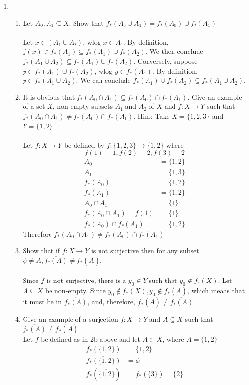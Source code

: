\documentclass[11pt]{article}
\begin{document}
\begin{enumerate}
\begin{enumerate}
\end{enumerate}
\newpage
\item %
\begin{enumerate}
\item Let $A_0 , A_1 \subseteq X$. Show that $f_*(A_0 \cup A_1 ) = f_*(A_0) \cup f_*(A_1)$
\\ \\
Let $x \in (A_1 \cup A_2)$, wlog $x \in A_1$.  By definition, $f(x) \in f_*(A_1) \subseteq f_*(A_1) \cup f_*(A_2).$  We then conclude $f_*(A_1 \cup A_2) \subseteq f_*(A_1) \cup f_*(A_2)$.  Conversely, suppose $y \in f_*(A_1) \cup f_*(A_2)$, wlog $y \in f_*(A_1)$.  By definition, $y \in f_*(A_1 \cup A_2)$.  We can conclude $f_*(A_1) \cup f_*(A_2) \subseteq f_*(A_1 \cup A_2)$.
\\

\item It is obvious that $f_*(A_0 \cap A_1) \subseteq f_*(A_0) \cap f_*(A_1)$.  Give an example of a set $X$, non-empty subsets $A_1$ and $A_2$ of $X$ and
$f : X \to Y$ such that $f_*(A_0 \cap A_1) \neq f_*(A_0) \cap f_*(A_1)$. Hint:
Take $X = \{1, 2, 3\}$ and $Y = \{1, 2\}$.
\\ \\
Let $f: X \to Y$ be defined by $f: \{1,2,3\} \to \{1,2\}$ where\\
$$f(1) = 1, 
f(2) = 2, 
f(3) = 2$$
\begin{align*}
A_0 &= \{1,2\}\\
A_1 &= \{1,3\}\\
f_*(A_0) &= \{1,2\}\\
f_*(A_1) &= \{1,2\}\\
A_0 \cap A_1 &= \{1\}\\
f_*(A_0 \cap A_1) = f(1) &= \{1\}\\
f_*(A_0) \cap f_*(A_1) &= \{1,2\}
\end{align*}
Therefore $f_*(A_0 \cap A_1) \neq f_*(A_0) \cap f_*(A_1)$
\\
\item Show that if $f:X \to Y$ is not surjective then for any subset $\phi \neq A, \overline{f_*(A)} \neq f_*(\overline{A})$.\\
\\
Since $f$ is not surjective, there is a $y_0 \in Y$ such that $y_0 \notin f_*(X)$.  Let $\bar{A} \subseteq X$ be non-empty.  Since $y_0 \notin f_*(X), y_0 \notin f_*(\bar{A})$, which means that it must be in $\overline{f_*(A)}$, and, therefore, $f_*(\bar{A}) \neq \overline{f_*(A)}$
\\
\item Give an example of a surjection $f: X \to Y$ and $A \subseteq X$ such that $\overline{f_*(A)} \neq f_*(\overline{A})$\\
Let $f$ be defined as in 2b above and let $A \subset X$, where $A = \{1,2\}$
\begin{align*}
f_*(\{1,2\}) &= \{1,2\}\\
\overline{f_*(\{1,2\})} &= \phi\\
f_*(\overline{\{1,2\}}) &= f_*(\{3\}) = \{2\}
\end{align*}
\end{enumerate} %
\newpage


\end{enumerate}
\end{document}
